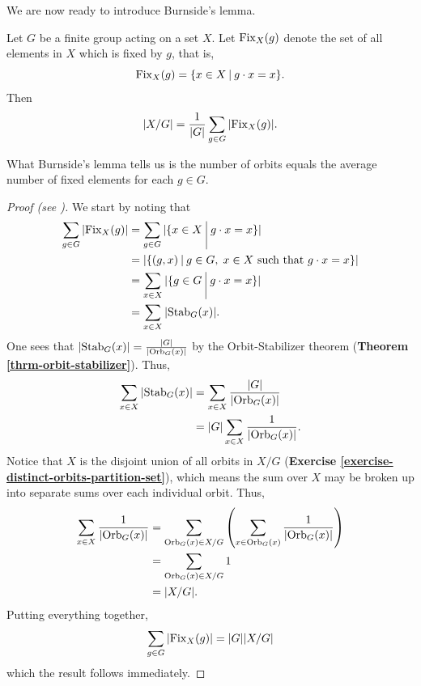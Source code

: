 We are now ready to introduce Burnside's lemma.
\begin{lemma}[Burnside]\label{lemma-burnside}
    Let $G$ be a finite group acting on a set $X$. Let $\mathrm{Fix}_{X}(g)$ denote the set of all elements in $X$ which is fixed by $g$, that is,
    \[
        \Fix{X}{g} = \{x \in X \vert g\cdot x = x\}.
    \]
    Then
    \[
        |X/G| = \frac{1}{|G|}\sum_{g\in G} |\mathrm{Fix}_{X}(g)|.
    \]
\end{lemma}
What Burnside's lemma tells us is the number of orbits equals the average number of fixed elements for each $g \in G$.
\begin{proof}[Proof (see \cite{proofwiki_burnsideslemma})]
    We start by noting that
    \begin{align*}
        \sum_{g\in G} |\Fix{X}{g}| &= \sum_{g\in G} |\{x \in X \vert g\cdot x = x\}|\\
        &= |\{(g, x) \vert g \in G,\; x \in X \text{ such that } g\cdot x = x\}|\\
        &= \sum_{x\in X} |\{g \in G \vert g\cdot x = x\}|\\
        &= \sum_{x\in X} |\Stab{G}{x}|.
    \end{align*}
    One sees that $|\mathrm{Stab}_{G}(x)| = \frac{|G|}{|\mathrm{Orb}_{G}(x)|}$ by the Orbit-Stabilizer theorem (\textbf{Theorem \ref{thrm-orbit-stabilizer}}). Thus,
    \begin{align*}
        \sum_{x\in X} |\mathrm{Stab}_{G}(x)| &= \sum_{x\in X} \frac{|G|}{|\mathrm{Orb}_{G}(x)|}\\
        &= |G|\sum_{x\in X} \frac{1}{|\mathrm{Orb}_{G}(x)|}.
    \end{align*}
    Notice that $X$ is the disjoint union of all orbits in $X/G$ (\textbf{Exercise \ref{exercise-distinct-orbits-partition-set}}), which means the sum over $X$ may be broken up into separate sums over each individual orbit. Thus,
    \begin{align*}
        \sum_{x\in X} \frac{1}{|\mathrm{Orb}_{G}(x)|} &= \sum_{\mathrm{Orb}_{G}(x) \in X/G}\left(\sum_{x \in \mathrm{Orb}_{G}(x)} \frac{1}{|\mathrm{Orb}_{G}(x)|}\right)\\
        &= \sum_{\mathrm{Orb}_{G}(x) \in X/G} 1\\
        &= |X/G|.
    \end{align*}
    Putting everything together,
    \[
        \sum_{g\in G} |\mathrm{Fix}_{X}(g)| = |G||X/G|
    \]
    which the result follows immediately.
\end{proof}

